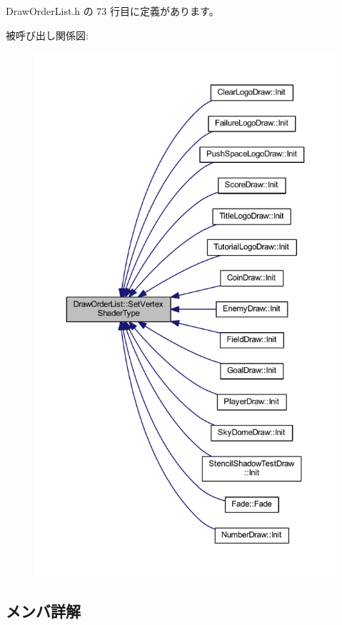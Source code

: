  Draw\+Order\+List.\+h の 73 行目に定義があります。

被呼び出し関係図\+:\nopagebreak
\begin{figure}[H]
\begin{center}
\leavevmode
\includegraphics[height=550pt]{class_draw_order_list_a1c2d881dd0d31f1c7cde4494f7c38481_icgraph}
\end{center}
\end{figure}


\subsection{メンバ詳解}
\mbox{\label{class_draw_order_list_ad2ce43c1b177ba4dae4198aa272eeb23}} 
